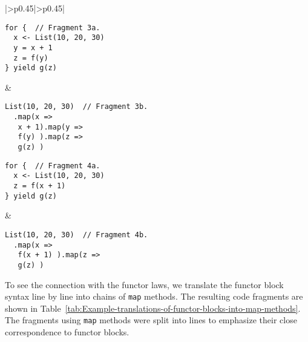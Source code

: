 \begin{table}
\begin{centering}
\begin{tabular}{|>{\centering}p{0.45\textwidth}|>{\centering}p{0.45\textwidth}|}
\begin{minipage}[t]{1.06\linewidth}%
\vspace{-0.6\baselineskip}
\begin{lstlisting}
for {  // Fragment 3a.
  x <- List(10, 20, 30)
  y = x + 1
  z = f(y)
} yield g(z)
\end{lstlisting}
\vspace{-0.25\baselineskip}
%
\end{minipage} & \hspace*{-0.0278\linewidth}%
\begin{minipage}[t]{1.06\linewidth}%
\vspace{-0.6\baselineskip}
\begin{lstlisting}
List(10, 20, 30)  // Fragment 3b.
  .map(x =>
   x + 1).map(y =>
   f(y) ).map(z =>
   g(z) )
\end{lstlisting}
\vspace{-0.25\baselineskip}
%
\end{minipage}\tabularnewline
\hline 
\hspace*{-0.0278\linewidth}%
\begin{minipage}[t]{1.06\linewidth}%
\vspace{-0.6\baselineskip}
\begin{lstlisting}
for {  // Fragment 4a.
  x <- List(10, 20, 30)
  z = f(x + 1)
} yield g(z)
\end{lstlisting}
\vspace{-0.1\baselineskip}
%
\end{minipage} & \hspace*{-0.0278\linewidth}%
\begin{minipage}[t]{1.06\linewidth}%
\vspace{-0.6\baselineskip}
\begin{lstlisting}
List(10, 20, 30)  // Fragment 4b.
  .map(x =>
   f(x + 1) ).map(z =>
   g(z) )
\end{lstlisting}
\vspace{-0.1\baselineskip}
%
\end{minipage}\tabularnewline
\hline 
\end{tabular}
\par\end{centering}
\caption{Example translations of functor blocks into \lstinline!map! methods.\label{tab:Example-translations-of-functor-blocks-into-map-methods}}
\end{table}

To see the connection with the functor laws, we translate the functor
block syntax line by line into chains of \lstinline!map! methods.
The resulting code fragments are shown in Table~\ref{tab:Example-translations-of-functor-blocks-into-map-methods}.
The fragments using \lstinline!map! methods were split into lines
to emphasize their close correspondence to functor blocks.

